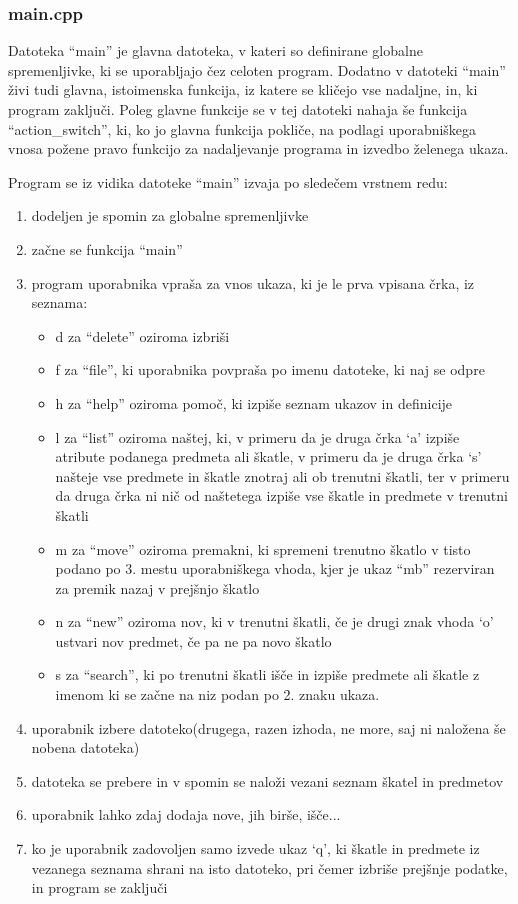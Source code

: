 \documentclass[12pt, a4paper, notitlepage]{article}
\begin{document}
      \subsubsection{main.cpp}
      Datoteka ``main'' je glavna datoteka, v kateri so definirane globalne spremenljivke, ki se uporabljajo čez celoten program. Dodatno v datoteki ``main'' živi tudi glavna, istoimenska funkcija, iz katere se kličejo vse nadaljne, in, ki program zaključi. Poleg glavne funkcije se v tej datoteki nahaja še funkcija ``action\_switch'', ki, ko jo glavna funkcija pokliče, na podlagi uporabniškega vnosa požene pravo funkcijo za nadaljevanje programa in izvedbo želenega ukaza.

      Program se iz vidika datoteke ``main'' izvaja po sledečem vrstnem redu:\\
      \begin{enumerate}
        \item dodeljen je spomin za globalne spremenljivke
        \item začne se funkcija ``main''
        \item program uporabnika vpraša za vnos ukaza, ki je le prva vpisana črka, iz seznama:
          \begin{itemize}
            \item d za ``delete'' oziroma izbriši
            \item f za ``file'', ki uporabnika povpraša po imenu datoteke, ki naj se odpre
            \item h za ``help'' oziroma pomoč, ki izpiše seznam ukazov in definicije
            \item l za ``list'' oziroma naštej, ki, v primeru da je druga črka `a' izpiše atribute podanega predmeta ali škatle, v primeru da je druga črka `s' našteje vse predmete in škatle znotraj ali ob trenutni škatli, ter v primeru da druga črka ni nič od naštetega izpiše vse škatle in predmete v trenutni škatli
            \item m za ``move'' oziroma premakni, ki spremeni trenutno škatlo v tisto podano po 3. mestu uporabniškega vhoda, kjer je ukaz ``mb'' rezerviran za premik nazaj v prejšnjo škatlo
            \item n za ``new'' oziroma nov, ki v trenutni škatli, če je drugi znak vhoda `o' ustvari nov predmet, če pa ne pa novo škatlo
            \item s za ``search'', ki po trenutni škatli išče in izpiše predmete ali škatle z imenom ki se začne na niz podan po 2. znaku ukaza.
          \end{itemize}
        \item uporabnik izbere datoteko(drugega, razen izhoda, ne more, saj ni naložena še nobena datoteka)
        \item datoteka se prebere in v spomin se naloži vezani seznam škatel in predmetov
        \item uporabnik lahko zdaj dodaja nove, jih birše, išče... 
        \item ko je uporabnik zadovoljen samo izvede ukaz `q', ki škatle in predmete iz vezanega seznama shrani na isto datoteko, pri čemer izbriše prejšnje podatke, in program se zaključi
      \end{enumerate}
\end{document}
